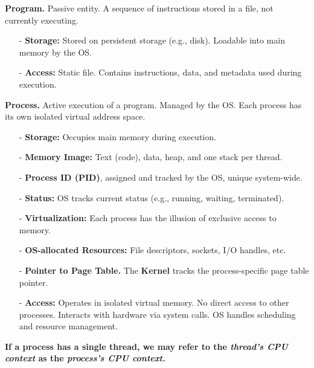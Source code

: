 \documentclass[8pt]{extarticle}
\begin{document}
\begin{minipage}[htp]{0.5\textwidth}
\begin{minipage}[htp]{0.6\textwidth}
    \noindent\textbf{Program.} Passive entity. A sequence of instructions stored in a file, not currently executing.
    \begin{itemize}[noitemsep,nolistsep,topsep=-10px,partopsep=0pt,parsep=0pt]  
        \item[-] \textbf{Storage:} Stored on persistent storage (e.g., disk). Loadable into main memory by the OS.
        \item[-] \textbf{Access:} Static file. Contains instructions, data, and metadata used during execution.
    \end{itemize}
    \vspace{10px}
    \noindent\textbf{Process.} Active execution of a program. Managed by the OS. Each process has its own isolated virtual address space.
    \begin{itemize}[noitemsep,nolistsep,topsep=-10px,partopsep=0pt,parsep=0pt]
        \item[-] \textbf{Storage:} Occupies main memory during execution.
        \item[-] \textbf{Memory Image:} Text (code), data, heap, and one stack per thread.
        \item[-] \textbf{Process ID (PID)}, assigned and tracked by the OS, unique system-wide.
        \item[-] \textbf{Status:} OS tracks current status (e.g., running, waiting, terminated).
        \item[-] \textbf{Virtualization:} Each process has the illusion of exclusive access to memory.
        \item[-] \textbf{OS-allocated Resources:} File descriptors, sockets, I/O handles, etc.
        \item[-] \textbf{Pointer to Page Table.} The \textbf{Kernel} tracks the process-specific page table pointer.
        \item[-] \textbf{Access:} Operates in isolated virtual memory. No direct access to other processes. Interacts with hardware via system calls. OS handles scheduling and resource management.
    \end{itemize}  
    \vspace{10px}
    \noindent\textbf{If a process has a single thread, we may refer to the \emph{thread's CPU context} as the \emph{process's CPU context.}}
\end{minipage}
\begin{minipage}[htp]{0.4\textwidth}

\end{minipage}
\end{minipage}
\end{document}
